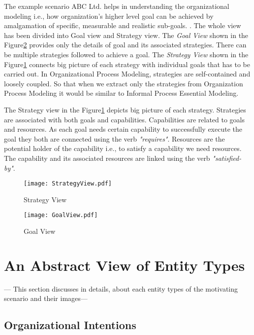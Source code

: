  The example scenario ABC Ltd. helps in understanding the organizational modeling i.e., how organization's higher level goal can be achieved by amalgamation of specific, measurable and realistic sub-goals. . The whole view has been divided into Goal view and Strategy view. The \textit{Goal View} shown in the Figure\ref{fig:goalview} provides only the details of goal and its associated strategies. There can be multiple strategies followed to achieve a goal. The \textit{Strategy View} shown in the Figure\ref{fig:strategyview} connects big picture of each strategy with individual goals that has to be carried out. In Organizational Process Modeling, strategies are self-contained and loosely coupled. So that when we extract only the strategies from Organization Process Modeling it would be similar to Informal Process Essential Modeling. 

 The Strategy view  in the Figure\ref{fig:strategyview} depicts big picture of each strategy. Strategies are associated with both goals and capabilities. Capabilities are related to goals and resources. As each goal needs certain capability to successfully execute the goal they both are connected using the verb \textit{"requires"}. Resources are the potential holder of the capability i.e., to satisfy a capability we need resources. The capability and its associated resources are linked using the verb \textit{"satisfied-by"}. 


\begin{figure}
	\centering
	\texttt{[image: StrategyView.pdf]}
	\caption{Strategy View}
	\label{fig:strategyview}
\end{figure}

\begin{figure}
	\centering
	\texttt{[image: GoalView.pdf]}
	\caption{Goal View}
	\label{fig:goalview}
\end{figure}

\section{An Abstract View of Entity Types}
\label{sec:entities}
 --- This section discusses in details, about each entity types of the motivating scenario and 
 their images---
 

\subsection{Organizational Intentions} 
\label{sec:intentions}



